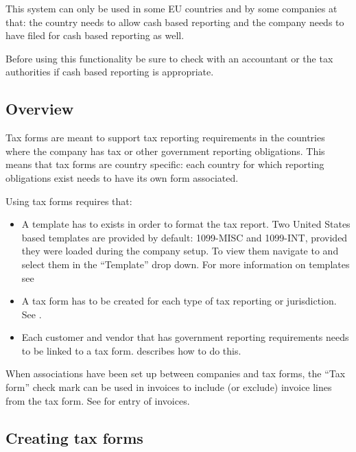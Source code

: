 This system can only be used in some EU countries and by some companies at that: the
country needs to allow cash based reporting and the company needs to have filed
for cash based reporting as well.

Before using this functionality be sure to check with an accountant or the tax
authorities if cash based reporting is appropriate.

\subsection{Overview}
\label{subsec-tax-taxforms-overview}

Tax forms are meant to support tax reporting requirements in the countries
where the company has tax or other government reporting obligations. This means that tax forms
are country specific: each country for which reporting obligations exist
needs to have its own form associated.

Using tax forms requires that:
\begin{itemize}
\item A template has to exists in order to format the tax report.  Two United States based templates are provided by default: 1099-MISC and 1099-INT, provided they were loaded during the company setup. To view them navigate to  and select them in the ``Template'' drop down. For more information on templates see 
\item A tax form has to be created for each type of tax reporting or jurisdiction. See .
\item  Each customer and vendor that has government reporting requirements needs to be
linked to a tax form.  describes how to do this.
\end{itemize}

When associations have been set up between companies and
tax forms, the ``Tax form'' check mark can be used in invoices to include
(or exclude) invoice lines from the tax form. See 
for entry of invoices.

\subsection{Creating tax forms}
\label{subsec-tax-taxforms-creation}

